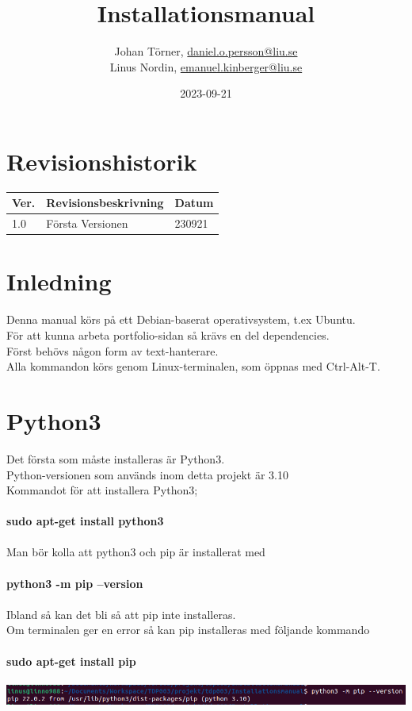 \documentclass{TDP003mall}
\author{Johan Törner, \url{daniel.o.persson@liu.se}\\
  Linus Nordin, \url{emanuel.kinberger@liu.se}\\}
\title{Installationsmanual}
\date{2023-09-21}
\begin{document}
\graphicspath{ {./images/} }

\projectpage
\section{Revisionshistorik}
\begin{table}[!h]
\begin{tabularx}{\linewidth}{|l|X|l|}
\hline
Ver. & Revisionsbeskrivning & Datum \\\hline
1.0 & Första Versionen & 230921 \\\hline
\end{tabularx}
\end{table}


\section{Inledning}

Denna manual körs på ett Debian-baserat operativsystem, t.ex Ubuntu.\\
För att kunna arbeta portfolio-sidan så krävs en del dependencies.\\
Först behövs någon form av text-hanterare.\\

Alla kommandon körs genom Linux-terminalen, som öppnas med Ctrl-Alt-T.\\



\section{Python3}
Det första som måste installeras är Python3.\\
Python-versionen som används inom detta projekt är 3.10\\ 
Kommandot för att installera Python3;\\\\
\textbf{sudo apt-get install python3}\\\\
Man bör kolla att python3 och pip är installerat med\\\\
\textbf{python3 -m pip --version}\\\\
Ibland så kan det bli så att pip inte installeras.\\
Om terminalen ger en error så kan pip installeras med följande kommando\\\\
\textbf{sudo apt-get install pip}\\\\
\includegraphics[scale=0.5]{pip_version}
\end{document}
